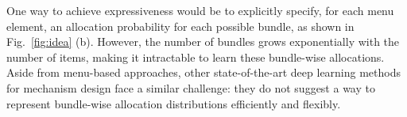 One way to achieve expressiveness would be to explicitly specify, for each menu element, an allocation probability for each possible bundle, as shown in Fig.~\ref{fig:idea} (b). However, the number of bundles grows exponentially with the number of items, making it intractable to learn these bundle-wise allocations. Aside from menu-based approaches, other state-of-the-art deep learning methods for mechanism design face a similar challenge: they do not suggest a way to represent bundle-wise allocation distributions efficiently and flexibly.
%

%

